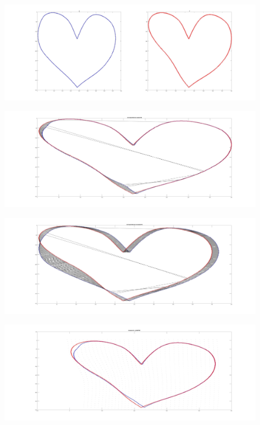 \documentclass[12pt]{article}
\begin{document}
\vspace{5mm}
\begin{figure}[H]
	\centering
	\includegraphics[width=1.1\textwidth]{1.jpg}
	\label{fig1}
\end{figure}
\vspace{5mm}
\vspace{5mm}
\begin{figure}[H]
	\centering
	\includegraphics[width=1.1\textwidth]{2.jpg}
	\label{fig1}
\end{figure}
\vspace{5mm}

\vspace{5mm}
\begin{figure}[H]
	\centering
	\includegraphics[width=1.1\textwidth]{3.jpg}
	\label{fig1}
\end{figure}
\vspace{5mm}

\vspace{5mm}
\begin{figure}[H]
	\centering
	\includegraphics[width=1.1\textwidth]{4.jpg}
	\label{fig1}
\end{figure}
\vspace{5mm}
\end{document}
